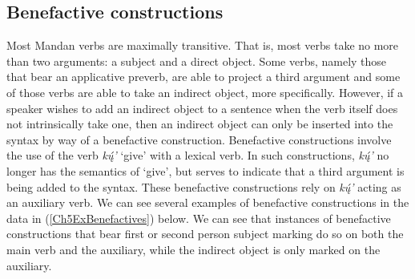 \subsection{Benefactive constructions}\label{Ch5Benefactives}

Most Mandan verbs are maximally transitive. That is, most verbs take no more than two arguments: a subject and a direct object. Some verbs, namely those that bear an applicative preverb, are able to project a third argument and some of those verbs are able to take an indirect object, more specifically. However, if a speaker wishes to add an indirect object to a sentence when the verb itself does not intrinsically take one, then an indirect object can only be inserted into the syntax by way of a benefactive construction. Benefactive constructions involve the use of the verb \textit{kų́'} `give' with a lexical verb. In such constructions, \textit{kų́'} no longer has the semantics of `give', but serves to indicate that a third argument is being added to the syntax. These benefactive constructions rely on \textit{kų́'} acting as an auxiliary verb. We can see several examples of benefactive constructions in the data in (\ref{Ch5ExBenefactives}) below. We can see that instances of benefactive constructions that bear first or second person subject marking do so on both the main verb and the auxiliary, while the indirect object is only marked on the auxiliary.

